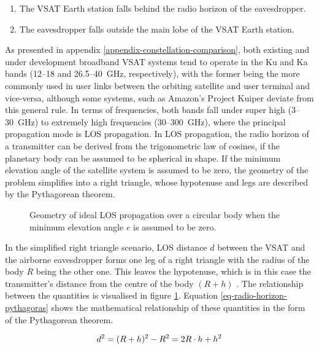 \documentclass[english, 12pt, a4paper, elec, utf8, a-1b, online]{aaltothesis}
\begin{document}
\begin{enumerate}
  \item The VSAT Earth station falls behind the radio horizon of the eavesdropper.
  \item The eavesdropper falls outside the main lobe of the VSAT Earth station.
\end{enumerate}

As presented in appendix \ref{appendix-constellation-comparison}, both existing and under development broadband VSAT systems tend to operate in the Ku and Ka bands (12--18 and 26.5--\SI{40}{\giga\hertz}, respectively), with the former being the more commonly used in user links between the orbiting satellite and user terminal and vice-versa, although some systems, such as Amazon's Project Kuiper deviate from this general rule.
In terms of frequencies, both bands fall under super high (3--\SI{30}{\giga\hertz}) to extremely high frequencies (30--\SI{300}{\giga\hertz}), where the principal propagation mode is LOS propagation.
In LOS propagation, the radio horizon of a transmitter can be derived from the trigonometric law of cosines, if the planetary body can be assumed to be spherical in shape. If the minimum elevation angle of the satellite system is assumed to be zero, the geometry of the problem simplifies into a right triangle, whose hypotenuse and legs are described by the Pythagorean theorem.

\begin{figure}[h]
  \centering
  
  \caption{Geometry of ideal LOS propagation over a circular body \cite{seybold2005introduction} when the minimum elevation angle $e$ is assumed to be zero.}
  \label{fig-interception-range-vacuum}
\end{figure}

In the simplified right triangle scenario, LOS distance $d$ between the VSAT and the airborne eavesdropper forms one leg of a right triangle with the radius of the body $R$ being the other one. This leaves the hypotenuse, which is in this case the transmitter's distance from the centre of the body $(R+h)$ \cite{seybold2005introduction}.
The relationship between the quantities is visualised in figure \ref{fig-interception-range-vacuum}. Equation \ref{eq-radio-horizon-pythagoras} shows the mathematical relationship of these quantities in the form of the Pythagorean theorem.

\begin{equation} \label{eq-radio-horizon-pythagoras}
  d^2=(R+h)^{2}-R^2= 2R \cdot h + h^2 \\
\end{equation}
\end{document}
